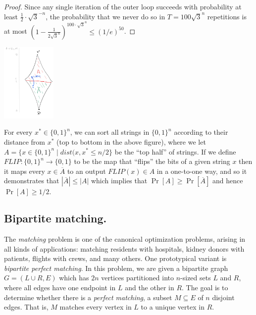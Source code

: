 \begin{proof}
Since any single iteration of the outer loop succeeds with probability
at least \(\tfrac{1}{2} \cdot \sqrt{3}^{-n}\), the probability that we
never do so in \(T=100 \sqrt{3}^{n}\) repetitions is at most
\((1-\tfrac{1}{2\sqrt{3}^{n}})^{100\cdot \sqrt{3}^n} \leq (1/e)^{50}\).

\end{proof}


\begin{marginfigure}
\centering
\includegraphics[width=\linewidth, height=1.5in, keepaspectratio]{../figure/flipaanalysis.png}
\caption{For every \(x^* \in \{0,1\}^n\), we can sort all strings in
\(\{0,1\}^n\) according to their distance from \(x^*\) (top to bottom in
the above figure), where we let
\(A = \{ x\in \{0,1\}^n \;|\; dist(x,x^* \leq n/2 \}\) be the ``top
half'' of strings. If we define
\(\ensuremath{\mathit{FLIP}}:\{0,1\}^n \rightarrow \{0,1\}\) to be the
map that ``flips'' the bits of a given string \(x\) then it maps every
\(x\in \overline{A}\) to an output
\(\ensuremath{\mathit{FLIP}}(x)\in A\) in a one-to-one way, and so it
demonstrates that \(|\overline{A}| \leq |A|\) which implies that
\(\Pr[A] \geq \Pr[\overline{A}]\) and hence \(\Pr[A] \geq 1/2\).}
\label{flipaanalysisfig}
\end{marginfigure}

\subsection{Bipartite matching.}\label{Bipartite-matching}

The \emph{matching} problem is one of the canonical optimization
problems, arising in all kinds of applications: matching residents with
hospitals, kidney donors with patients, flights with crews, and many
others. One prototypical variant is \emph{bipartite perfect matching}.
In this problem, we are given a bipartite graph \(G = (L\cup R,E)\)
which has \(2n\) vertices partitioned into \(n\)-sized sets \(L\) and
\(R\), where all edges have one endpoint in \(L\) and the other in
\(R\). The goal is to determine whether there is a \emph{perfect
matching}, a subset \(M \subseteq E\) of \(n\) disjoint edges. That is,
\(M\) matches every vertex in \(L\) to a unique vertex in \(R\).


